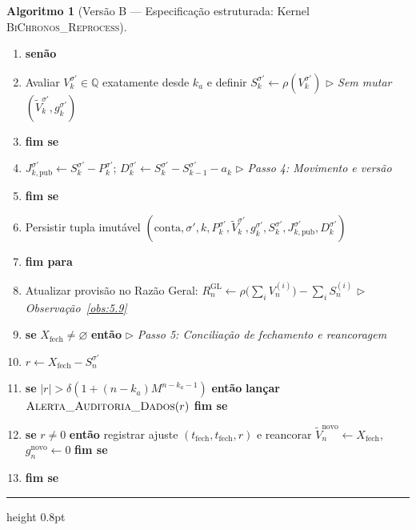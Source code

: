 \documentclass[11pt, a4paper]{article}
\theoremstyle{definition}
\newtheorem{algoritmo}[definicao]{Algoritmo}
\theoremstyle{plain}
\theoremstyle{remark}
\begin{document}
\begin{algoritmo}[Versão B — Especificação estruturada: Kernel \textsc{BiChronos\_Reprocess}]
\begin{enumerate}[label=\footnotesize\textbf{\arabic*:}, leftmargin=2.2em, itemsep=0.15em, topsep=0.3em]
    \item \hspace{2.4em} \textbf{senão}
    \item \hspace{3.6em} Avaliar $V_k^{\sigma'} \in \mathbb{Q}$ exatamente desde $k_a$ e definir $S_k^{\sigma'} \leftarrow \rho(V_k^{\sigma'})$ \hfill $\triangleright$ \emph{Sem mutar $(\tilde{V}_k^{\sigma'}, g_k^{\sigma'})$}
    \item \hspace{2.4em} \textbf{fim se}
    \item \hspace{2.4em} $J_{k,\text{pub}}^{\sigma'} \leftarrow S_k^{\sigma'} - P_k^{\sigma'}$; \quad $D_k^{\sigma'} \leftarrow S_k^{\sigma'} - S_{k-1}^{\sigma'} - a_k$ \hfill $\triangleright$ \emph{Passo 4: Movimento e versão}
    \item \hspace{1.2em} \textbf{fim se}
    \item \hspace{1.2em} Persistir tupla imutável $(\text{conta}, \sigma', k, P_k^{\sigma'}, \tilde{V}_k^{\sigma'}, g_k^{\sigma'}, S_k^{\sigma'}, J_{k,\text{pub}}^{\sigma'}, D_k^{\sigma'})$
    \item \textbf{fim para}
    \item Atualizar provisão no Razão Geral: $R_n^{\text{GL}} \leftarrow \rho\big(\sum_i V_n^{(i)}\big) - \sum_i S_n^{(i)}$ \hfill $\triangleright$ \emph{Observação~\ref{obs:5.9}}
    \item \textbf{se} $X_{\text{fech}} \neq \varnothing$ \textbf{então} \hfill $\triangleright$ \emph{Passo 5: Conciliação de fechamento e reancoragem}
    \item \hspace{1.2em} $r \leftarrow X_{\text{fech}} - S_n^{\sigma'}$
    \item \hspace{1.2em} \textbf{se} $|r| > \delta(1 + (n - k_a)M^{n - k_a - 1})$ \textbf{então} \textbf{lançar} $\textsc{Alerta\_Auditoria\_Dados}(r)$ \textbf{fim se}
    \item \hspace{1.2em} \textbf{se} $r \neq 0$ \textbf{então} registrar ajuste $(t_{\text{fech}}, t_{\text{fech}}, r)$ e reancorar $\tilde{V}_n^{\text{novo}} \leftarrow X_{\text{fech}}$, $g_n^{\text{novo}} \leftarrow 0$ \textbf{fim se}
    \item \textbf{fim se}
\end{enumerate}
\hrule height 0.8pt
\vspace{0.2em}
\end{algoritmo}
\end{document}
